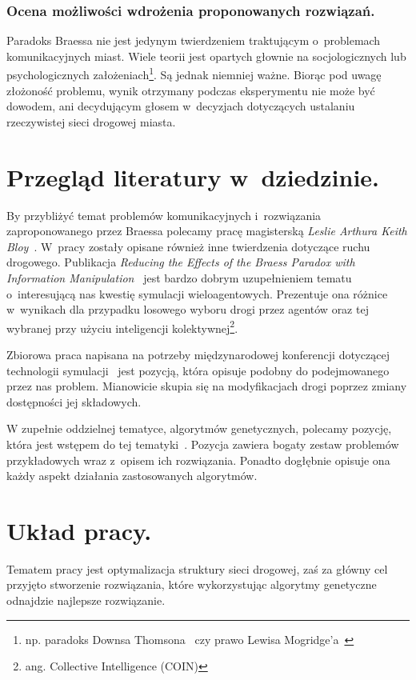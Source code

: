 \documentclass[twoside,12pt]{report}
\begin{document}
\subsubsection{Ocena możliwości wdrożenia proponowanych rozwiązań.}
Paradoks Braessa nie jest jedynym twierdzeniem traktującym o~problemach komunikacyjnych miast. Wiele teorii jest opartych głownie na socjologicznych lub psychologicznych założeniach\footnote{np. paradoks Downsa Thomsona~\cite{downs} czy prawo Lewisa Mogridge’a~\cite{lewis}}. Są jednak niemniej ważne. Biorąc pod uwagę złożoność problemu, wynik otrzymany podczas eksperymentu nie może być dowodem, ani decydującym głosem w~decyzjach dotyczących ustalaniu rzeczywistej sieci drogowej miasta. 


\section{Przegląd literatury w~dziedzinie.}
By przybliżyć temat problemów komunikacyjnych i~rozwiązania zaproponowanego przez Braessa polecamy pracę magisterską \textit{Leslie Arthura Keith Bloy}~\cite{investigation}. W~pracy zostały opisane również inne twierdzenia dotyczące ruchu drogowego. Publikacja \textit{Reducing the Effects of the Braess Paradox with Information Manipulation}~\cite{reducingtheeffects} jest bardzo dobrym uzupełnieniem tematu o~interesującą nas kwestię symulacji wieloagentowych. Prezentuje ona różnice w~wynikach dla przypadku losowego wyboru drogi przez agentów oraz tej wybranej przy użyciu inteligencji kolektywnej\footnote{ang. Collective Intelligence (COIN)}. 

Zbiorowa praca napisana na potrzeby międzynarodowej konferencji dotyczącej technologii symulacji~\cite{reducingtheeffects} jest pozycją, która opisuje podobny do podejmowanego przez nas problem. Mianowicie skupia się na modyfikacjach drogi poprzez zmiany dostępności jej składowych.

W zupełnie oddzielnej tematyce, algorytmów genetycznych, polecamy pozycję, która jest wstępem do tej tematyki~\cite{gene}. Pozycja zawiera bogaty zestaw problemów przykładowych wraz z~opisem ich rozwiązania. Ponadto dogłębnie opisuje ona każdy aspekt działania zastosowanych algorytmów. 

\section{Układ pracy.}
Tematem pracy jest optymalizacja struktury sieci drogowej, zaś za główny cel przyjęto stworzenie rozwiązania, które wykorzystując algorytmy genetyczne odnajdzie najlepsze rozwiązanie.
 
\end{document}
